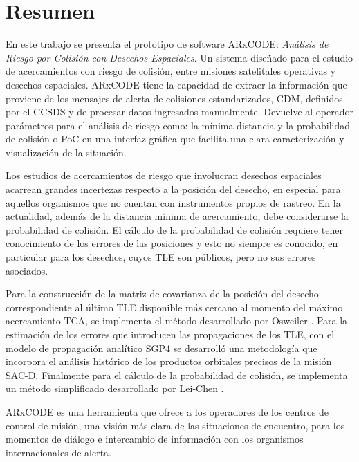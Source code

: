 \chapter*{Resumen}
\label{chap:resumen}
En este trabajo se presenta el prototipo de software ARxCODE: {\it{An\'alisis de Riesgo por Colisi\'on con Desechos Espaciales}}. Un sistema dise\~nado para el estudio de acercamientos con riesgo de colisi\'on, entre misiones satelitales operativas y desechos espaciales. 
ARxCODE tiene la capacidad de extraer la informaci\'on que proviene de los mensajes de alerta de colisiones estandarizados, \ac{CDM}, definidos por el \ac{CCSDS} y de procesar datos ingresados manualmente.
Devuelve al operador par\'ametros para el an\'alisis de riesgo como: la m\'inima distancia y la probabilidad de colisi\'on  o \ac{PoC} en una interfaz gr\'afica que facilita una clara caracterizaci\'on y visualizaci\'on de la situaci\'on.

Los estudios de acercamientos de riesgo que involucran desechos espaciales acarrean grandes incertezas respecto a la posici\'on del desecho, en especial para aquellos organismos que no cuentan con instrumentos propios de rastreo.
En la actualidad, adem\'as de la distancia m\'inima de acercamiento, debe considerarse la probabilidad de colisi\'on. El c\'alculo de la probabilidad de colisi\'on requiere tener conocimiento de los errores de las posiciones y esto no siempre es conocido, en particular para los desechos, cuyos \ac{TLE} son p\'ublicos, pero no sus errores asociados. 

Para la construcci\'on de la matriz de covarianza de la posici\'on del desecho correspondiente al \'ultimo TLE disponible m\'as cercano al momento del m\'aximo acercamiento \ac{TCA}, se implementa el m\'etodo desarrollado por Osweiler \citep{osweiler}.
Para la estimaci\'on de los errores que introducen las propagaciones de los TLE, con el modelo de propagaci\'on anal\'itico \ac{SGP4} se desarroll\'o una metodolog\'ia que incorpora el análisis hist\'orico de los productos orbitales precisos de la misi\'on SAC-D.
Finalmente para el c\'alculo de la probabilidad de colisi\'on, se implementa un m\'etodo simplificado desarrollado por Lei-Chen \citep{leichen}.

ARxCODE es una herramienta que ofrece a los operadores de los centros de control de misi\'on, una visi\'on m\'as clara de las situaciones de encuentro, para los momentos de di\'alogo e intercambio de informaci\'on con los organismos internacionales de alerta.

\endinput



